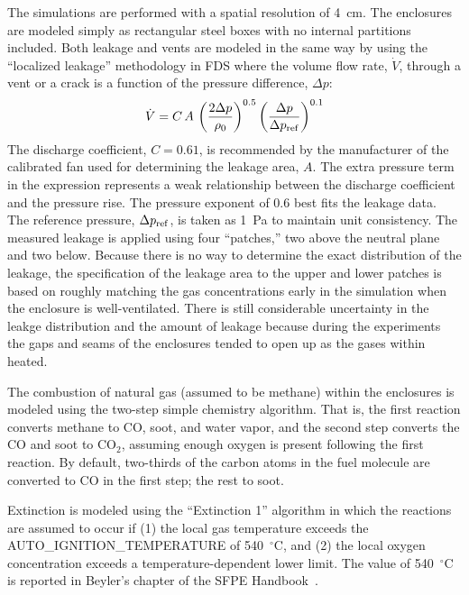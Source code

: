 The simulations are performed with a spatial resolution of 4~cm. The enclosures are modeled simply as rectangular steel boxes with no internal partitions included. Both leakage and vents are modeled in the same way by using the ``localized leakage'' methodology in FDS where the volume flow rate, $\dot{V}$, through a vent or a crack is a function of the pressure difference, $\Delta p$:
\begin{equation}
    \dot{V} = C \, A \, \left( \frac{2 \Delta p}{\rho_0} \right)^{0.5} \left( \frac{\Delta p}{\Delta p_{\rm ref}} \right)^{0.1} \label{leak_eq}
\end{equation}
The discharge coefficient, $C=0.61$, is recommended by the manufacturer of the calibrated fan used for determining the leakage area, $A$. The extra pressure term in the expression represents a weak relationship between the discharge coefficient and the pressure rise. The pressure exponent of 0.6 best fits the leakage data. The reference pressure, $\Delta p_{\rm ref}$, is taken as 1~Pa to maintain unit consistency. The measured leakage is applied using four ``patches,'' two above the neutral plane and two below. Because there is no way to determine the exact distribution of the leakage, the specification of the leakage area to the upper and lower patches is based on roughly matching the gas concentrations early in the simulation when the enclosure is well-ventilated. There is still considerable uncertainty in the leakge distribution and the amount of leakage because during the experiments the gaps and seams of the enclosures tended to open up as the gases within heated.

The combustion of natural gas (assumed to be methane) within the enclosures is modeled using the two-step simple chemistry algorithm. That is, the first reaction converts methane to CO, soot, and water vapor, and the second step converts the CO and soot to CO$_2$, assuming enough oxygen is present following the first reaction. By default, two-thirds of the carbon atoms in the fuel molecule are converted to CO in the first step; the rest to soot.

Extinction is modeled using the ``Extinction 1'' algorithm in which the reactions are assumed to occur if (1) the local gas temperature exceeds the {\ct AUTO\_IGNITION\_TEMPERATURE} of 540~$^\circ$C, and (2) the local oxygen concentration exceeds a temperature-dependent lower limit. The value of 540~$^\circ$C is reported in Beyler's chapter of the SFPE Handbook~\cite{SFPE:Beyler}.


\FloatBarrier

